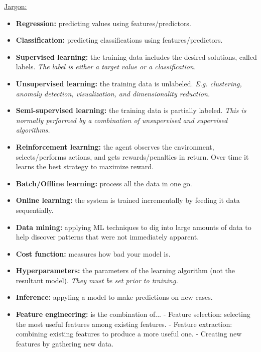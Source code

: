 \vspace{-4.0mm}
\underline{Jargon:}
\begin{itemize}
\vspace{-4.0mm}
\item
\textbf{Regression:} predicting values using features/predictors.
\item
\textbf{Classification:} predicting classifications using features/predictors.
\item
\textbf{Supervised learning:}
the training data includes the desired solutions, called labels.\newline
\textit{The label is either a target value or a classification.}
\item
\textbf{Unsupervised learning:}
the training data is unlabeled.\newline
\textit{E.g. clustering, anomaly detection, visualization, and dimensionality reduction.}
\item
\textbf{Semi-supervised learning:}
the training data is partially labeled.\newline
\textit{This is normally performed by a combination of unsupervised and supervised algorithms.}
\item
\textbf{Reinforcement learning:}
the agent observes the environment, selects/performs actions, and gets rewards/penalties in return.
Over time it learns the best strategy to maximize reward.
\item
\textbf{Batch/Offline learning:}
process all the data in one go.
\item
\textbf{Online learning:}
the system is trained incrementally by feeding it data sequentially.
\item
\textbf{Data mining:}
applying ML techniques to dig into large amounts of data
to help discover patterns that were not immediately apparent.
\item
\textbf{Cost function:}
measures how bad your model is.
\item
\textbf{Hyperparameters:}
the parameters of the learning algorithm (not the resultant model).\newline
\textit{They must be set prior to training.}
\item
\textbf{Inference:}
appyling a model to make predictions on new cases.
\item
\textbf{Feature engineering:}
is the combination of...\newline
- Feature selection: selecting the most useful features among existing features.\newline
- Feature extraction: combining existing features to produce a more useful one.\newline
- Creating new features by gathering new data.
\end{itemize}

